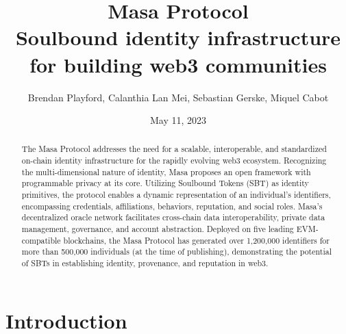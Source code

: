 \documentclass{article}
\title{%
  Masa Protocol \\
\bigskip
  \large Soulbound identity infrastructure for building web3 communities
  }
\author{Brendan Playford, Calanthia Lan Mei, Sebastian Gerske, Miquel Cabot}
\date{May 11, 2023} %
\begin{document}
\maketitle

\vspace{0.2cm}

\begin{abstract}
    The Masa Protocol addresses the need for a scalable, interoperable, and standardized on-chain identity infrastructure for the rapidly evolving web3 ecosystem. Recognizing the multi-dimensional nature of identity, Masa proposes an open framework with programmable privacy at its core. Utilizing Soulbound Tokens (SBT) as identity primitives, the protocol enables a dynamic representation of an individual's identifiers, encompassing credentials, affiliations, behaviors, reputation, and social roles. Masa's decentralized oracle network facilitates cross-chain data interoperability, private data management, governance, and account abstraction. Deployed on five leading EVM-compatible blockchains, the Masa Protocol has generated over 1,200,000 identifiers for more than 500,000 individuals (at the time of publishing), demonstrating the potential of SBTs in establishing identity, provenance, and reputation in web3.
\end{abstract}

\section{Introduction}
\end{document}
